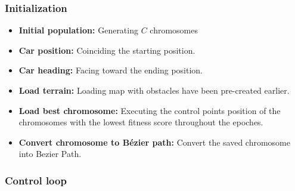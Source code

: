     \subsubsection{Initialization}
    \begin{itemize}
      \item \textbf{Initial population:} Generating $C$ chromosomes 
      \item \textbf{Car position:} Coinciding the starting position.
      \item \textbf{Car heading:} Facing toward the ending position.
      \item \textbf{Load terrain:} Loading map with obstacles have been pre-created earlier.
      \item \textbf{Load best chromosome:} Executing the control points position of the chromosomes with the lowest fitness score throughout the epoches.
      \item \textbf{Convert chromosome to Bézier path:} Convert the saved chromosome into Bezier Path.
    \end{itemize}
    \subsubsection{Control loop}

